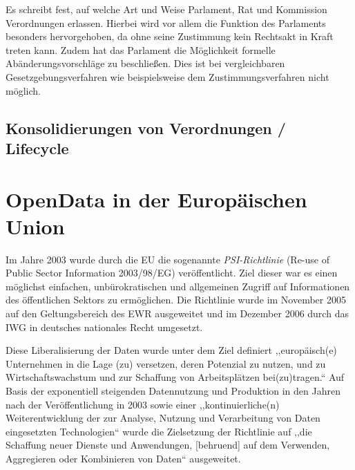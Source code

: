     Es schreibt fest, auf welche Art und Weise Parlament, Rat und Kommission Verordnungen erlassen. 
    Hierbei wird vor allem die Funktion des Parlaments besonders hervorgehoben, da ohne seine Zustimmung kein Rechtsakt in Kraft treten kann.
    Zudem hat das Parlament die Möglichkeit formelle Abänderungsvorschläge zu beschließen. 
    Dies ist bei vergleichbaren Gesetzgebungsverfahren wie beispielsweise dem Zustimmungsverfahren nicht möglich.
        
        \subsection{Konsolidierungen von Verordnungen / Lifecycle}
            \pagebreak    
        

    \section{OpenData in der Europäischen Union}

Im Jahre 2003 wurde durch die EU die sogenannte \textit{PSI-Richtlinie} (Re-use of Public Sector Information 2003/98/EG) veröffentlicht.
Ziel dieser war es einen möglichst einfachen, unbürokratischen und allgemeinen Zugriff auf Informationen des öffentlichen Sektors zu ermöglichen.
Die Richtlinie wurde im November 2005 auf den Geltungsbereich des EWR ausgeweitet\cite{2005D0105} und im Dezember 2006 durch das \ac{IWG} in deutsches nationales Recht umgesetzt.

Diese Liberalisierung der Daten wurde unter dem Ziel definiert ,,europäisch(e) Unternehmen in die Lage (zu) versetzen, deren Potenzial zu nutzen, und zu Wirtschaftswachstum und zur Schaffung von Arbeitsplätzen bei(zu)tragen.``\cite[ErwG. 5]{2003L0098} 
Auf Basis der exponentiell steigenden Datennutzung und Produktion in den Jahren nach der Veröffentlichung in 2003 sowie einer ,,kontinuierliche(n) Weiterentwicklung der zur Analyse, Nutzung und Verarbeitung von Daten eingesetzten Technologien``\cite[ErwG. 5]{2013L0037} wurde die Zielsetzung der Richtlinie auf ,,die Schaffung neuer Dienste und Anwendungen, [behruend] auf dem Verwenden, Aggregieren oder Kombinieren von Daten``\cite[ErwG. 5]{2013L0037} ausgeweitet. 

